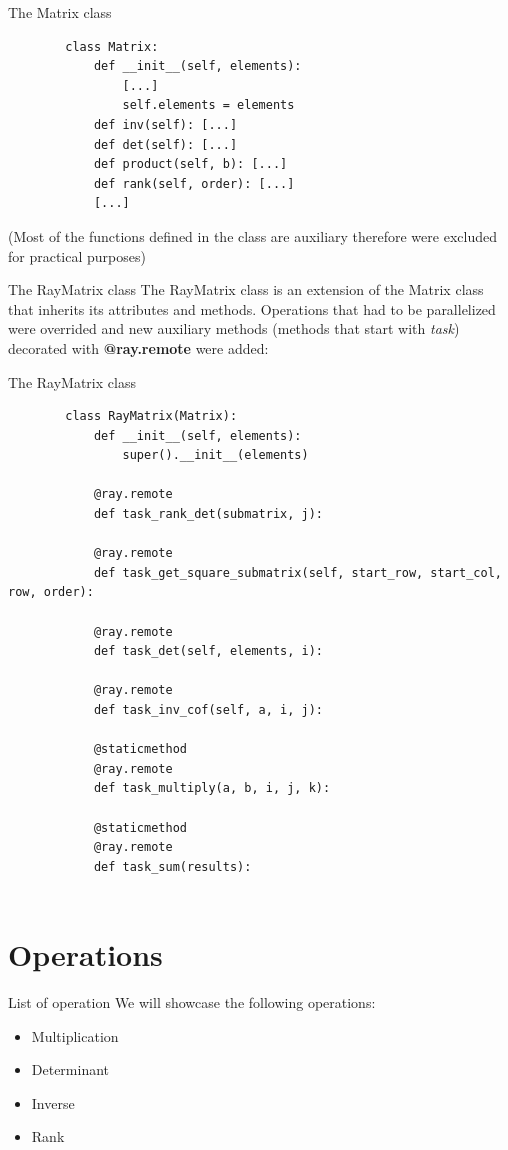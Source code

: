 \documentclass{beamer}
\begin{document}
\begin{frame}[fragile]{The Matrix class}
    \begin{verbatim}
        class Matrix:
            def __init__(self, elements):
                [...]
                self.elements = elements
            def inv(self): [...]
            def det(self): [...]
            def product(self, b): [...]
            def rank(self, order): [...]
            [...]

    \end{verbatim}

    (Most of the functions defined in the class are auxiliary therefore were excluded for practical purposes)
\end{frame}

\begin{frame}{The RayMatrix class}
    The \alert{RayMatrix} class is an extension of the Matrix class that inherits its attributes and methods. Operations that had to be parallelized were overrided and new auxiliary methods (methods that start with \textit{task\textunderscore}) decorated with \textbf{@ray.remote} were added:
\end{frame}

\begin{frame}[fragile]{The RayMatrix class}
    \begin{tiny}
        \begin{verbatim}
        class RayMatrix(Matrix):
            def __init__(self, elements):
                super().__init__(elements)
            
            @ray.remote
            def task_rank_det(submatrix, j):

            @ray.remote
            def task_get_square_submatrix(self, start_row, start_col, row, order):

            @ray.remote
            def task_det(self, elements, i):

            @ray.remote
            def task_inv_cof(self, a, i, j):

            @staticmethod
            @ray.remote
            def task_multiply(a, b, i, j, k):
            
            @staticmethod
            @ray.remote
            def task_sum(results):
        
    \end{verbatim}
    \end{tiny}
\end{frame}

\section{Operations}
\begin{frame}{List of operation}
    We will showcase the following operations:
    \begin{itemize}
        \item{Multiplication}
        \item{Determinant}
        \item{Inverse}
        \item{Rank}
    \end{itemize}
\end{frame}
\end{document}
